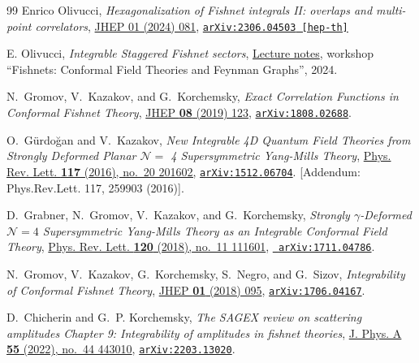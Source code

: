 \documentclass[a4paper,11pt]{article}
\numberwithin{equation}{section}
\begin{document}
\begin{thebibliography}{99}
Enrico Olivucci,
\textit{Hexagonalization of Fishnet integrals II: overlaps and multi-point correlators},
\href{https://doi.org/10.1007/JHEP01(2024)081}{JHEP 01 (2024) 081},
\href{https://doi.org/10.48550/arXiv.2306.04503}
{\texttt{\href{https://arxiv.org/abs/2306.04503}{\texttt{arXiv:2306.04503}} [hep-th]}}

E. Olivucci, \textit{Integrable Staggered Fishnet sectors}, \href{https://indico.hiskp.uni-bonn.de/event/445/contributions/1694/}{Lecture notes}, workshop ``Fishnets: Conformal Field Theories and Feynman Graphs'', 2024.

N.~Gromov, V.~Kazakov, and G.~Korchemsky, {\it {Exact Correlation Functions in
		Conformal Fishnet Theory}},  \href{https://link.springer.com/article/10.1007/JHEP08(2019)123}{ JHEP {\bf 08} (2019) 123},
\href{http://arxiv.org/abs/1808.02688}{{\tt \href{https://arxiv.org/abs/1808.02688}{\texttt{arXiv:1808.02688}}}}.

O.~G\"urdo\u{g}an and V.~Kazakov, {\it {New Integrable 4D Quantum Field
		Theories from Strongly Deformed Planar $\mathcal N = $ 4 Supersymmetric
		Yang-Mills Theory}}, 
\href{https://journals.aps.org/prl/abstract/10.1103/PhysRevLett.117.201602}{ Phys. Rev. Lett. {\bf 117} (2016), no.~20 201602,}
\href{http://arxiv.org/abs/1512.06704}{{\tt \href{https://arxiv.org/abs/1512.06704}{\texttt{arXiv:1512.06704}}}}.
[Addendum: Phys.Rev.Lett. 117, 259903 (2016)].

D.~Grabner, N.~Gromov, V.~Kazakov, and G.~Korchemsky, {\it {Strongly
		$\gamma$-Deformed $\mathcal{N}=4$ Supersymmetric Yang-Mills Theory as an
		Integrable Conformal Field Theory}},  \href{https://journals.aps.org/prl/abstract/10.1103/PhysRevLett.120.111601}{ Phys. Rev. Lett. {\bf 120}
	(2018), no.~11 111601},
\href{http://arxiv.org/abs/1711.04786}{{\tt
		\href{https://arxiv.org/abs/1711.04786}{\texttt{arXiv:1711.04786}}}}.

N.~Gromov, V.~Kazakov, G.~Korchemsky, S.~Negro, and G.~Sizov, {\it
	{Integrability of Conformal Fishnet Theory}},  
\href{https://link.springer.com/article/10.1007/JHEP01(2018)095}{JHEP {\bf 01} (2018)  095}, \href{http://arxiv.org/abs/1706.04167}{{\tt \href{https://arxiv.org/abs/1706.04167}{\texttt{arXiv:1706.04167}}}}.

D.~Chicherin and G.~P. Korchemsky, {\it {The SAGEX review on scattering
		amplitudes Chapter 9: Integrability of amplitudes in fishnet theories}},
\href{https://iopscience.iop.org/article/10.1088/1751-8121/ac8c72}{J. Phys. A {\bf 55} (2022), no.~44 443010},
\href{http://arxiv.org/abs/2203.13020}{{\tt \href{https://arxiv.org/abs/2203.13020}{\texttt{arXiv:2203.13020}}}}.


\end{thebibliography}
\end{document}
